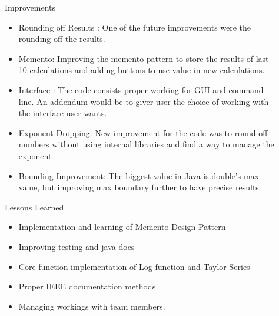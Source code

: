 \documentclass[final]{beamer}
\newlength{\sepwid}
\newlength{\onecolwid}
\newlength{\twocolwid}
\begin{document}
\begin{frame}
\begin{columns}[t]
\begin{column}{\twocolwid}
\begin{columns}[t,totalwidth=\twocolwid]
\begin{column}{\onecolwid}
\end{column} %

\end{columns} %

\end{column} %

\begin{column}{\sepwid}\end{column} %

\begin{column}{\onecolwid} %


\begin{exampleblock}{Improvements}
\begin{itemize}
    \item Rounding off Results : One of the future improvements were the rounding off the results.
    \item Memento: Improving the memento pattern to store the results of last 10 calculations and adding buttons to use value in new calculations.
    \item Interface : The code consists proper working for GUI and command line. An addendum would be to giver user the choice of working with the interface user wants.
    \item Exponent Dropping: New improvement for the code was to round off numbers without using internal libraries and find a way to manage the exponent
    \item Bounding Improvement: The biggest value in Java is double's max value, but improving max boundary further to have precise results. 
\end{itemize}
\end{exampleblock}


\begin{exampleblock}{Lessons Learned}
\begin{itemize}
\item Implementation and learning of Memento Design Pattern
\item Improving testing and java docs 
\item Core function implementation of Log function and Taylor Series
\item Proper IEEE documentation methods
\item Managing workings with team members.
\end{itemize}


\end{exampleblock}
\end{column}
\end{columns}
\end{frame}
\end{document}
